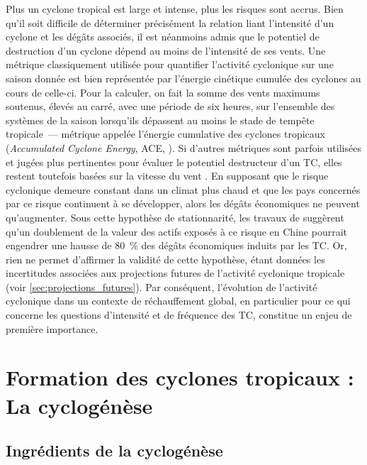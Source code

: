 \documentclass[../main.tex]{subfiles}
\begin{document}
Plus un cyclone tropical est large et intense, plus les risques sont accrus. Bien qu'il soit difficile de déterminer précisément la relation liant l'intensité
d'un cyclone et les dégâts associés, il est néanmoins admis que le potentiel de destruction d'un cyclone dépend au moins de l'intensité de ses vents. Une
métrique classiquement utilisée pour quantifier l'activité cyclonique sur une saison donnée est bien représentée par l'énergie cinétique cumulée des cyclones au
cours de celle-ci. Pour la calculer, on fait la somme des vents maximums soutenus, élevés au carré, avec une période de six heures, sur l'ensemble des systèmes
de la saison lorsqu'ils dépassent au moins le stade de tempête tropicale~--- métrique appelée l'énergie cumulative des cyclones tropicaux (\textit{Accumulated
Cyclone Energy}, ACE, \textcite{bell_climate_2000}). Si d'autres métriques sont parfois utilisées et jugées plus pertinentes pour évaluer le potentiel destructeur
d'un TC, elles restent toutefois basées sur la vitesse du vent \parencite{powell_tropical_2007}. En supposant que le risque cyclonique demeure constant
dans un climat plus chaud et que les pays concernés par ce risque continuent à se développer, alors les dégâts économiques ne peuvent qu'augmenter. Sous cette
hypothèse de stationnarité, les travaux de \textcite{ye_dependence_2020} suggèrent qu'un doublement de la valeur des actifs exposés à ce risque en Chine pourrait
engendrer une hausse de \SI{80}{\percent} des dégâts économiques induits par les TC. Or, rien ne permet d'affirmer la validité de cette hypothèse, étant données
les incertitudes associées aux projections futures de l'activité cyclonique tropicale (voir \cref{sec:projections_futures}). Par conséquent, l'évolution de
l'activité cyclonique dans un contexte de réchauffement global, en particulier pour ce qui concerne les questions d'intensité et de fréquence des TC, constitue
un enjeu de première importance.

\section{Formation des cyclones tropicaux : La cyclogénèse}
  
\subsection{Ingrédients de la cyclogénèse}\label{sec:conditions_cyclogenese}
\end{document}
